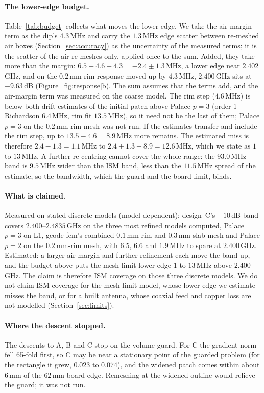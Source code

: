 \documentclass{anvil-paper}
\begin{document}
\paragraph{The lower-edge budget.}
Table~\ref{tab:budget} collects what moves the lower edge. We take the
air-margin term as the dip's $4.3$\,MHz and carry the $1.3$\,MHz edge scatter
between re-meshed air boxes (Section~\ref{sec:accuracy}) as the uncertainty
of the measured terms; it is the scatter of the air re-meshes only, applied
once to the sum. Added, they take more than the margin:
$6.5 - 4.6 - 4.3 = -2.4 \pm 1.3$\,MHz, a lower edge near $2.402$\,GHz, and on
the $0.2$\,mm-rim response moved up by $4.3$\,MHz, $2.400$\,GHz sits at
$-9.63$\,dB (Figure~\ref{fig:response}b). The sum assumes that the terms add,
and the air-margin term was measured on the coarse model. The rim step
($4.6$\,MHz) is below both drift estimates of the initial patch above Palace
$p = 3$ (order-1 Richardson $6.4$\,MHz, rim fit $13.5$\,MHz), so it need not be
the last of them; Palace $p = 3$ on the $0.2$\,mm-rim mesh was not run. If the
estimates transfer and include the rim step, up to $13.5 - 4.6 = 8.9$\,MHz
more remains. The estimated miss is therefore $2.4 - 1.3 = 1.1$\,MHz to
$2.4 + 1.3 + 8.9 = 12.6$\,MHz, which we state as $1$ to $13$\,MHz. A further
re-centring cannot cover the whole range: the $93.0$\,MHz band is $9.5$\,MHz
wider than the ISM band, less than the $11.5$\,MHz spread of the estimate, so
the bandwidth, which the guard and the board limit, binds.

\paragraph{What is claimed.}
Measured on stated discrete models (model-dependent): design~C's $-10$\,dB
band covers $2.400$--$2.4835$\,GHz on the three most refined models computed,
Palace $p = 3$ on L1, geode-fem's combined $0.1$\,mm-rim and $0.3$\,mm-slab
mesh and Palace $p = 2$ on the $0.2$\,mm-rim mesh, with $6.5$, $6.6$ and
$1.9$\,MHz to spare at $2.400$\,GHz. Estimated: a larger air margin and
further refinement each move the band up, and the budget above puts the
mesh-limit lower edge $1$ to $13$\,MHz above $2.400$\,GHz. The claim is
therefore ISM coverage on those three discrete models. We do not claim ISM
coverage for the mesh-limit model, whose lower edge we estimate misses the
band, or for a built antenna, whose coaxial feed and copper loss are not
modelled (Section~\ref{sec:limits}).

\paragraph{Where the descent stopped.}
The descents to A, B and C stop on the volume guard. For C the gradient norm fell 65-fold first, so C may be
near a stationary point of the guarded problem (for the rectangle it grew,
$0.023$ to $0.074$), and the widened patch comes within about $6$\,mm of
the $62$\,mm board edge. Remeshing at the widened outline would relieve the
guard; it was not run.
\end{document}

